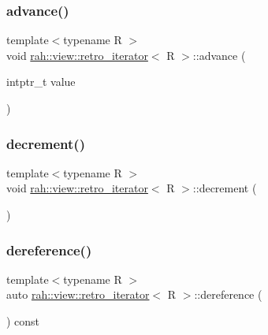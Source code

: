 \subsubsection{\texorpdfstring{advance()}{advance()}}
{\footnotesize\ttfamily template$<$typename R $>$ \\
void \mbox{\hyperlink{structrah_1_1view_1_1retro__iterator}{rah\+::view\+::retro\+\_\+iterator}}$<$ R $>$\+::advance (\begin{DoxyParamCaption}\item[{intptr\+\_\+t}]{value }\end{DoxyParamCaption})\hspace{0.3cm}{\ttfamily [inline]}}

\mbox{\label{structrah_1_1view_1_1retro__iterator_a8da10018776a90937b78433b85a73330}} 
\subsubsection{\texorpdfstring{decrement()}{decrement()}}
{\footnotesize\ttfamily template$<$typename R $>$ \\
void \mbox{\hyperlink{structrah_1_1view_1_1retro__iterator}{rah\+::view\+::retro\+\_\+iterator}}$<$ R $>$\+::decrement (\begin{DoxyParamCaption}{ }\end{DoxyParamCaption})\hspace{0.3cm}{\ttfamily [inline]}}

\mbox{\label{structrah_1_1view_1_1retro__iterator_a056244974e69e84f1a31ab82e115ba46}} 
\subsubsection{\texorpdfstring{dereference()}{dereference()}}
{\footnotesize\ttfamily template$<$typename R $>$ \\
auto \mbox{\hyperlink{structrah_1_1view_1_1retro__iterator}{rah\+::view\+::retro\+\_\+iterator}}$<$ R $>$\+::dereference (\begin{DoxyParamCaption}{ }\end{DoxyParamCaption}) const\hspace{0.3cm}{\ttfamily [inline]}}

